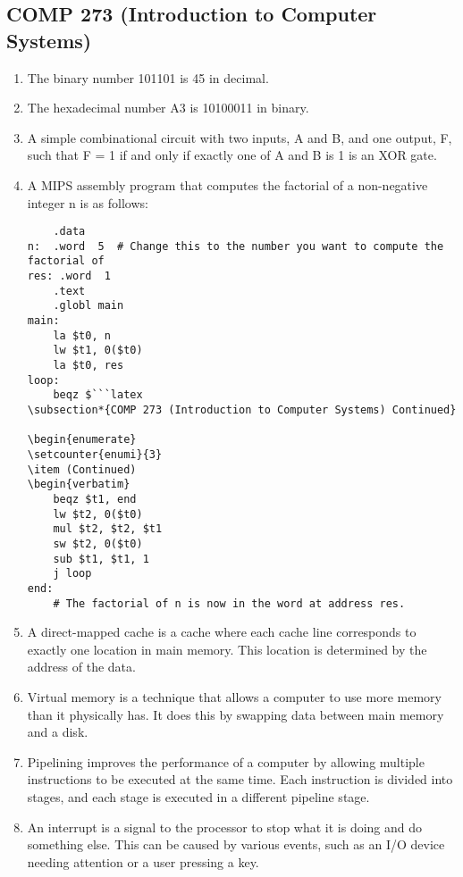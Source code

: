 \begin{enumerate}
\subsection*{COMP 273 (Introduction to Computer Systems)}

\begin{enumerate}
\item The binary number 101101 is 45 in decimal.
\item The hexadecimal number A3 is 10100011 in binary.
\item A simple combinational circuit with two inputs, A and B, and one output, F, such that F = 1 if and only if exactly one of A and B is 1 is an XOR gate.
\item A MIPS assembly program that computes the factorial of a non-negative integer n is as follows:
\begin{verbatim}
    .data
n:  .word  5  # Change this to the number you want to compute the factorial of
res: .word  1
    .text
    .globl main
main:
    la $t0, n
    lw $t1, 0($t0)
    la $t0, res
loop:
    beqz $```latex
\subsection*{COMP 273 (Introduction to Computer Systems) Continued}

\begin{enumerate}
\setcounter{enumi}{3}
\item (Continued)
\begin{verbatim}
    beqz $t1, end
    lw $t2, 0($t0)
    mul $t2, $t2, $t1
    sw $t2, 0($t0)
    sub $t1, $t1, 1
    j loop
end:
    # The factorial of n is now in the word at address res.
\end{verbatim}
\item A direct-mapped cache is a cache where each cache line corresponds to exactly one location in main memory. This location is determined by the address of the data.
\item Virtual memory is a technique that allows a computer to use more memory than it physically has. It does this by swapping data between main memory and a disk.
\item Pipelining improves the performance of a computer by allowing multiple instructions to be executed at the same time. Each instruction is divided into stages, and each stage is executed in a different pipeline stage.
\item An interrupt is a signal to the processor to stop what it is doing and do something else. This can be caused by various events, such as an I/O device needing attention or a user pressing a key.
\end{enumerate}


\end{enumerate}
